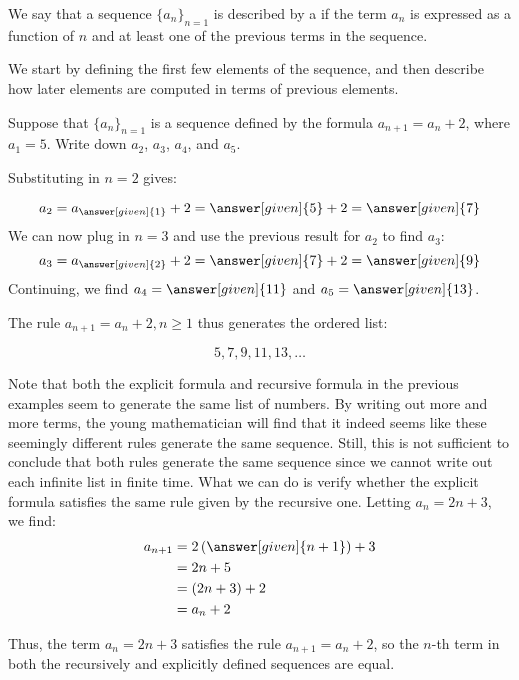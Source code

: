 \documentclass{ximera}
\begin{document}
\begin{definition}
We say that a sequence $\{a_n\}_{n=1}$ is described by a  if the term $a_n$ is expressed as a function of $n$ and at least one of the previous terms in the sequence.
\end{definition}

We start by defining the first few elements of the sequence, and then describe how later elements are computed in terms of previous elements.

\begin{example}
 Suppose that $\{a_n\}_{n=1}$ is a sequence defined by the formula $a_{n+1} = a_n+2$, where $a_1 = 5$.  Write down $a_2$, $a_3$, $a_4$, and $a_5$.
 
 \begin{explanation}
 Substituting in $n=2$ gives:
 
 \[
 a_2 = a_{\answer[given]{1}}+2 = \answer[given]{5}+2 = \answer[given]{7}
 \]
 We can now plug in $n=3$ and use the previous result for $a_2$ to find $a_3$:
  \[
 a_3 = a_{\answer[given]{2}}+2 = \answer[given]{7}+2 = \answer[given]{9}
 \]
 Continuing, we find $a_4 = \answer[given]{11}$ and $a_5 = \answer[given]{13}$.
 
The rule $a_{n+1} = a_n+2, n \geq 1$ thus generates the ordered list:

\[
5,7,9,11,13, \dots
\]   

 \end{explanation}
\end{example}


Note that both the explicit formula and recursive formula in the previous examples seem to generate the same list of numbers.  By writing out more and more terms, the young mathematician will find that it indeed seems like these seemingly different rules generate the same sequence.  Still, this is not sufficient to conclude that both rules generate the same sequence since we cannot write out each infinite list in finite time.  What we can do is verify whether the explicit formula satisfies the same rule given by the recursive one.  Letting $a_n = 2n+3$, we find:
\begin{align*}
a_{n+1} &= 2\left(\answer[given]{n+1}\right)+3 \\
&= 2n+5 \\
&= \left(2n+3\right) +2 \\
&= a_n+2
\end{align*}  

Thus, the term $a_n = 2n+3$ satisfies the rule $a_{n+1}=a_n+2$, so the $n$-th term in both the recursively and explicitly defined sequences are equal. 
 
\end{document}
